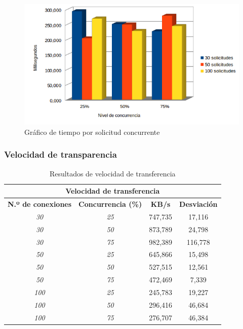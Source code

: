 \begin{figure}[!ht]
	\begin{center}
		\includegraphics[width=1\textwidth]{../images/gra_tsc.png}
		\caption{Gráfico de tiempo por solicitud concurrente}
		\label{fig:gra_tsc}
	\end{center}
\end{figure}

\newpage
\subsubsection{Velocidad de transparencia}
\begin{table}[!ht]
	\begin{center}
		\begin{tabular}{|c|c|c|c|}
			\hline
			\multicolumn{4}{|c|}{{\bf Velocidad de transferencia}}                            \\ \hline
			{\bf N.º de conexiones} & {\bf Concurrencia (\%)} & {\bf KB/s} & {\bf Desviación} \\ \hline
			{\it 30}                & {\it 25}                & 747,735    & 17,116           \\ \hline
			{\it 30}                & {\it 50}                & 873,789    & 24,798           \\ \hline
			{\it 30}                & {\it 75}                & 982,389    & 116,778          \\ \hline
			{\it 50}                & {\it 25}                & 645,866    & 15,498           \\ \hline
			{\it 50}                & {\it 50}                & 527,515    & 12,561           \\ \hline
			{\it 50}                & {\it 75}                & 472,469    & 7,339            \\ \hline
			{\it 100}               & {\it 25}                & 245,783    & 19,227           \\ \hline
			{\it 100}               & {\it 50}                & 296,416    & 46,684           \\ \hline
			{\it 100}               & {\it 75}                & 276,707    & 46,384           \\ \hline
		\end{tabular}
		\caption{Resultados de velocidad de transferencia}
		\label{table:rvt}
	\end{center}
\end{table}

